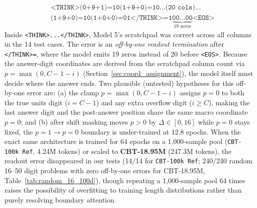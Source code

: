 \documentclass[10pt,twocolumn]{article}
\begin{document}
\begin{enumerate}[leftmargin=*,nosep]
    \begin{equation*}
    \begin{aligned}
    &\texttt{<THINK>(0+9+1)=10(1+9+0)=10...(20 cols)...}\\
    &\texttt{(1+9+0)=10(1+0+0)=01</THINK>=1}\underbrace{\texttt{00...00}}_{19\text{ zeros}}\texttt{<EOS>}
    \end{aligned}
    \end{equation*}
    Inside \texttt{<THINK>...</THINK>}, Model 5's scratchpad was correct across all columns in the 14 test cases. The error is an \emph{off-by-one readout termination} after \texttt{</THINK>=}, where the model emits 19 zeros instead of 20 before \texttt{<EOS>}. Because the answer-digit coordinates are derived from the scratchpad column count via $p=\max(0, C-1-i)$ (Section~\ref{sec:coord_assignment}), the model itself must decide where the answer ends. Two plausible (untested) hypotheses for this off-by-one error are: (a) the clamp $p=\max(0, C-1-i)$ assigns $p=0$ to both the true units digit ($i=C-1$) and any extra overflow digit ($i \ge C$), making the last answer digit and the post-answer position share the same macro coordinate $p=0$; and (b) after shift masking moves $p>0$ by $\Delta \in [0, 16]$ while $p=0$ stays fixed, the $p=1 \to p=0$ boundary is under-trained at 12.8 epochs. When the exact same architecture is trained for 64 epochs on a 1,000-sample pool (\texttt{CBT-100k Ref}, 4.24M tokens) or scaled to \textbf{CBT-18.95M} (247.3M tokens), the readout error disappeared in our tests (14/14 for \texttt{CBT-100k Ref}; 240/240 random 16--50 digit problems with zero off-by-one errors for CBT-18.95M, Table~\ref{tab:random_16_100d}), though repeating a 1,000-sample pool 64 times raises the possibility of overfitting to training length distributions rather than purely resolving boundary attention.
\end{enumerate}
\end{document}
